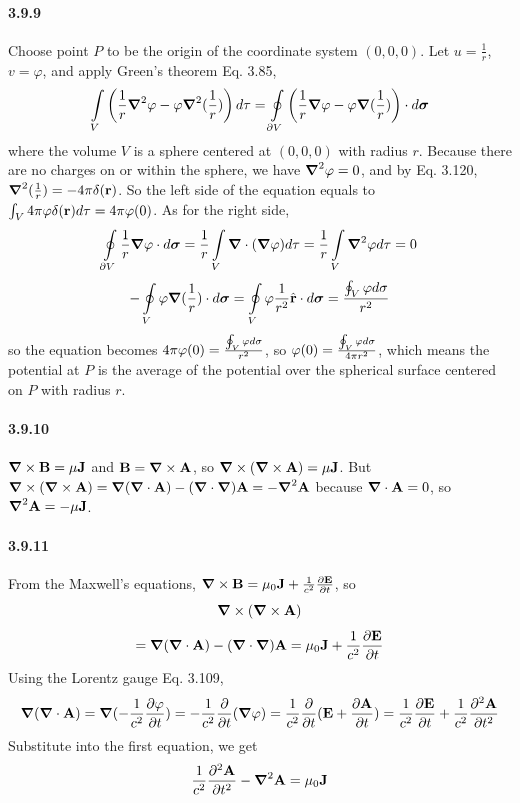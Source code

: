\documentclass[a4paper]{article}
\begin{document}
\paragraph{3.9.9}
Choose point $P$ to be the origin of the coordinate system $(0,0,0)$. Let $u=\frac{1}{r}$, $v=\varphi$, and apply Green's theorem Eq. 3.85, 
\[
\int\displaylimits_V\left(\frac{1}{r}\boldsymbol{\nabla}^2\varphi-\varphi\boldsymbol{\nabla}^2(\frac{1}{r}) \right)d\tau=\oint\displaylimits_{\partial V}\left(\frac{1}{r}\boldsymbol{\nabla}\varphi-\varphi\boldsymbol{\nabla}(\frac{1}{r}) \right)\cdot d\boldsymbol{\sigma}
\]
where the volume $V$ is a sphere centered at $(0,0,0)$ with radius $r$. Because there are no charges on or within the sphere, we have $\boldsymbol{\nabla}^2\varphi=0$, and by Eq. 3.120, $\boldsymbol{\nabla}^2(\frac{1}{r})=-4\pi\delta(\mathbf{r})$. So the left side of the equation equals to $\int\displaylimits_V4\pi\varphi\delta(\mathbf{r})d\tau=4\pi\varphi(0)$. As for the right side, \[\oint\displaylimits_{\partial V}\frac{1}{r}\boldsymbol{\nabla}\varphi\cdot d\boldsymbol{\sigma}=\frac{1}{r}\int\displaylimits_V\boldsymbol{\nabla}\cdot(\boldsymbol{\nabla}\varphi)d\tau=\frac{1}{r}\int\displaylimits_V\boldsymbol{\nabla}^2\varphi d\tau=0\] \[-\oint\displaylimits_V\varphi\boldsymbol{\nabla}(\frac{1}{r})\cdot d\boldsymbol{\sigma}=\oint\displaylimits_V\varphi\frac{1}{r^2}\hat{\mathbf{r}}\cdot d\boldsymbol{\sigma}=\frac{\oint\displaylimits_V\varphi d\sigma}{r^2}\]
so the equation becomes $4\pi\varphi(0)=\frac{\oint\displaylimits_V\varphi d\sigma}{r^2}$, so $\varphi(0)=\frac{\oint\displaylimits_V\varphi d\sigma}{4\pi r^2}$, which means the potential at $P$ is the average of the potential over the spherical surface centered on $P$ with radius $r$.

\paragraph{3.9.10}
$\boldsymbol{\nabla}\times\mathbf{B}=\mu\mathbf{J}$ and $\mathbf{B}=\boldsymbol{\nabla}\times\mathbf{A}$, so $\boldsymbol{\nabla}\times(\boldsymbol{\nabla}\times\mathbf{A})=\mu\mathbf{J}$. But $\boldsymbol{\nabla}\times(\boldsymbol{\nabla}\times\mathbf{A})=\boldsymbol{\nabla}(\boldsymbol{\nabla}\cdot\mathbf{A})-(\boldsymbol{\nabla}\cdot\boldsymbol{\nabla})\mathbf{A}=-\boldsymbol{\nabla}^2\mathbf{A}$ because $\boldsymbol{\nabla}\cdot\mathbf{A}=0$, so $\boldsymbol{\nabla}^2\mathbf{A}=-\mu\mathbf{J}$.

\paragraph{3.9.11}
From the Maxwell's equations, $\boldsymbol{\nabla}\times\mathbf{B}=\mu_0\mathbf{J}+\frac{1}{c^2}\frac{\partial\mathbf{E}}{\partial t}$, so 
\[
\boldsymbol{\nabla}\times(\boldsymbol{\nabla}\times\mathbf{A})
\]
\[
=\boldsymbol{\nabla}(\boldsymbol{\nabla}\cdot\mathbf{A})-(\boldsymbol{\nabla}\cdot\boldsymbol{\nabla})\mathbf{A}=\mu_0\mathbf{J}+\frac{1}{c^2}\frac{\partial\mathbf{E}}{\partial t}
\]
Using the Lorentz gauge Eq. 3.109, \[
\boldsymbol{\nabla}(\boldsymbol{\nabla}\cdot\mathbf{A})=\boldsymbol{\nabla}(-\frac{1}{c^2}\frac{\partial\varphi}{\partial t})=-\frac{1}{c^2}\frac{\partial}{\partial t}(\boldsymbol{\nabla}\varphi)=\frac{1}{c^2}\frac{\partial}{\partial t}(\mathbf{E}+\frac{\partial\mathbf{A}}{\partial t})=\frac{1}{c^2}\frac{\partial\mathbf{E}}{\partial t}+\frac{1}{c^2}\frac{\partial^2\mathbf{A}}{\partial t^2}
\]
Substitute into the first equation, we get
\[
\frac{1}{c^2}\frac{\partial^2\mathbf{A}}{\partial t^2}-\boldsymbol{\nabla}^2\mathbf{A}=\mu_0\mathbf{J}
\]
\end{document}
